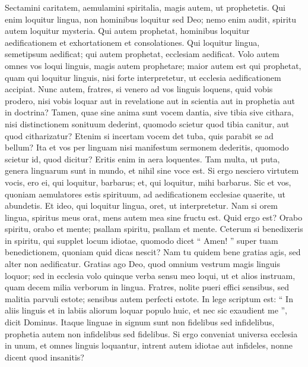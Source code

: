 \begin{biblechapter}
\begin{biblechapter}
\begin{biblechapter}
\begin{biblechapter}
\begin{biblechapter}
\begin{biblechapter}
\begin{biblechapter}
\begin{biblechapter}
\begin{biblechapter}
\begin{biblechapter}
\begin{biblechapter}
\begin{biblechapter}
\begin{biblechapter}
\begin{biblechapter}
\verse Sectamini caritatem, aemulamini spiritalia, magis autem, ut prophetetis. 
\verse Qui enim loquitur lingua, non hominibus loquitur sed Deo; nemo enim audit, spiritu autem loquitur mysteria. 
\verse Qui autem prophetat, hominibus loquitur aedificationem et exhortationem et consolationes. 
\verse Qui loquitur lingua, semetipsum aedificat; qui autem prophetat, ecclesiam aedificat. 
\verse Volo autem omnes vos loqui linguis, magis autem prophetare; maior autem est qui prophetat, quam qui loquitur linguis, nisi forte interpretetur, ut ecclesia aedificationem accipiat.
 \verse Nunc autem, fratres, si venero ad vos linguis loquens, quid vobis prodero, nisi vobis loquar aut in revelatione aut in scientia aut in prophetia aut in doctrina? 
\verse Tamen, quae sine anima sunt vocem dantia, sive tibia sive cithara, nisi distinctionem sonituum dederint, quomodo scietur quod tibia canitur, aut quod citharizatur? 
\verse Etenim si incertam vocem det tuba, quis parabit se ad bellum? 
\verse Ita et vos per linguam nisi manifestum sermonem dederitis, quomodo scietur id, quod dicitur? Eritis enim in aera loquentes. 
 \verse Tam multa, ut puta, genera linguarum sunt in mundo, et nihil sine voce est. 
 \verse Si ergo nesciero virtutem vocis, ero ei, qui loquitur, barbarus; et, qui loquitur, mihi barbarus.
 \verse Sic et vos, quoniam aemulatores estis spirituum, ad aedificationem ecclesiae quaerite, ut abundetis. 
\verse Et ideo, qui loquitur lingua, oret, ut interpretetur. 
\verse Nam si orem lingua, spiritus meus orat, mens autem mea sine fructu est. 
 \verse Quid ergo est? Orabo spiritu, orabo et mente; psallam spiritu, psallam et mente. 
\verse Ceterum si benedixeris in spiritu, qui supplet locum idiotae, quomodo dicet “ Amen! ” super tuam benedictionem, quoniam quid dicas nescit? 
\verse Nam tu quidem bene gratias agis, sed alter non aedificatur. 
\verse Gratias ago Deo, quod omnium vestrum magis linguis loquor; 
\verse sed in ecclesia volo quinque verba sensu meo loqui, ut et alios instruam, quam decem milia verborum in lingua.
 \verse Fratres, nolite pueri effici sensibus, sed malitia parvuli estote; sensibus autem perfecti estote.
 \verse In lege scriptum est:
 “ In aliis linguis et in labiis aliorum
 loquar populo huic,
 et nec sic exaudient me ”,
 dicit Dominus. 
\verse Itaque linguae in signum sunt non fidelibus sed infidelibus, prophetia autem non infidelibus sed fidelibus. 
\verse Si ergo conveniat universa ecclesia in unum, et omnes linguis loquantur, intrent autem idiotae aut infideles, nonne dicent quod insanitis? 

\end{biblechapter}
\end{biblechapter}
\end{biblechapter}
\end{biblechapter}
\end{biblechapter}
\end{biblechapter}
\end{biblechapter}
\end{biblechapter}
\end{biblechapter}
\end{biblechapter}
\end{biblechapter}
\end{biblechapter}
\end{biblechapter}
\end{biblechapter}
